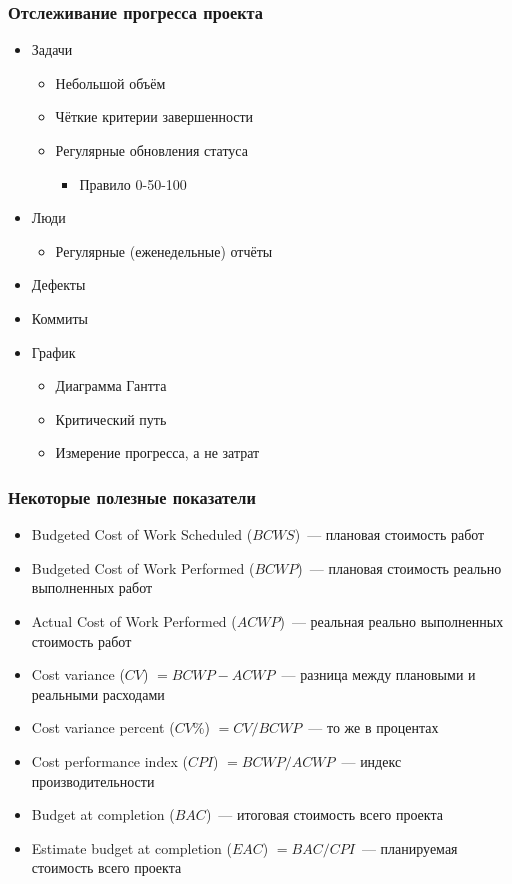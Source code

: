 \documentclass{../../slides-style}
\begin{document}
    \begin{frame}
        \frametitle{Отслеживание прогресса проекта}
        \begin{itemize}
            \item Задачи
            \begin{itemize}
                \item Небольшой объём
                \item Чёткие критерии завершенности
                \item Регулярные обновления статуса
                \begin{itemize}
                    \item Правило 0-50-100
                \end{itemize}
            \end{itemize}
            \item Люди
            \begin{itemize}
                \item Регулярные (еженедельные) отчёты 
            \end{itemize}
            \item Дефекты
            \item Коммиты
            \item График
            \begin{itemize}
                \item Диаграмма Гантта
                \item Критический путь
                \item Измерение прогресса, а не затрат
            \end{itemize}
        \end{itemize}
    \end{frame}

    \begin{frame}
        \frametitle{Некоторые полезные показатели}
        \begin{itemize}
            \item Budgeted Cost of Work Scheduled ($BCWS$)~--- плановая стоимость работ
            \item Budgeted Cost of Work Performed ($BCWP$)~--- плановая стоимость реально выполненных работ
            \item Actual Cost of Work Performed ($ACWP$)~--- реальная реально выполненных стоимость работ
            \item Cost variance ($CV$) $= BCWP - ACWP$~--- разница между плановыми и реальными расходами
            \item Cost variance percent ($CV\%$) $= CV / BCWP$~--- то же в процентах
            \item Cost performance index ($CPI$) $= BCWP / ACWP$~--- индекс производительности
            \item Budget at completion ($BAC$)~--- итоговая стоимость всего проекта
            \item Estimate budget at completion ($EAC$) $= BAC / CPI$~--- планируемая стоимость всего проекта
        \end{itemize}
    \end{frame}
\end{document}
